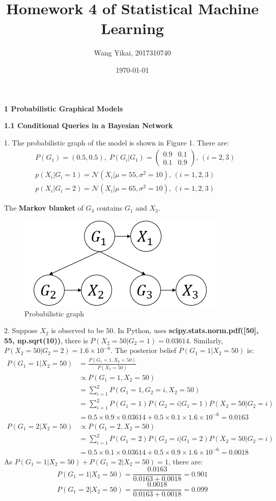\documentclass[12pt]{article}
\title{Homework 4 of Statistical Machine Learning}
\author{Wang Yikai, 2017310740}
\date{\today}
\begin{document}
\maketitle

{\large \bf 1 Probabilistic Graphical Models}
\bigskip \par
{\bf 1.1 Conditional Queries in a Bayesian Network}
\smallskip\par
1. The probabilistic graph of the model is shown in Figure 1. There are:
\begin{align*}
&P(G_1) = (0.5,0.5),\;
P(G_i|G_1)=
 \left(
 \begin{matrix}
   0.9 & 0.1\\
   0.1 & 0.9
  \end{matrix}
  \right)
,\,(i=2,3)\\
&p(X_i|G_i = 1) = \mathcal{N}(X_i |\mu = 55,\sigma^2 = 10),\, (i = 1,2,3)\\
&p(X_i|G_i = 2) = \mathcal{N}(X_i |\mu = 65,\sigma^2 = 10),\, (i = 1,2,3)
\end{align*}

The {\bf Markov blanket} of $G_3$ contains $G_1$ and $X_3$.
\begin{figure}[ht]
\centering
\includegraphics[scale=0.6]{1.png}
\caption{Probabilistic graph}
\end{figure}
\par 
2. Suppose $X_2$ is observed to be $50$. In Python, uses {\bf scipy.stats.norm.pdf([50], 55, np.sqrt(10))}, there is $P(X_2=50|G_2=1)=0.03614$. Similarly, $P(X_2=50|G_2=2)=1.6\times10^{-6}$.
The posterior belief $P(G_1=1|X_2=50)$ is:
\begin{align*}
P(G_1=1|X_2=50)&=\frac{P(G_1=1,X_2=50)}{P(X_2=50)}\\
&\propto P(G_1=1,X_2=50)\\
&=\sum_{i=1}^2 P(G_1=1,G_2=i,X_2=50)\\
&=\sum_{i=1}^2 P(G_1=1)P(G_2=i|G_1=1)P(X_2=50|G_2=i)\\
&=0.5\times0.9\times0.03614 + 0.5\times0.1\times1.6\times10^{-6}=0.0163
\end{align*}
\begin{align*}
P(G_1=2|X_2=50)&\propto P(G_1=2,X_2=50)\\
&=\sum_{i=1}^2 P(G_1=2)P(G_2=i|G_1=2)P(X_2=50|G_2=i)\\
&=0.5\times0.1\times0.03614 + 0.5\times0.9\times1.6\times10^{-6}=0.0018
\end{align*}
As $P(G_1=1|X_2=50)+P(G_1=2|X_2=50)=1$, there are:
$$P(G_1=1|X_2=50)=\frac{0.0163}{0.0163+0.0018}=0.901$$
$$P(G_1=2|X_2=50)=\frac{0.0018}{0.0163+0.0018}=0.099$$
\end{document}
